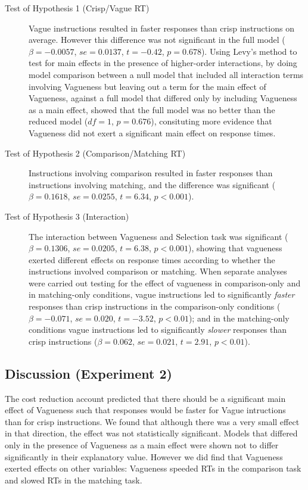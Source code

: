 \begin{description} 
	\item [Test of Hypothesis 1 (Crisp/Vague RT)] Vague instructions resulted in faster responses than crisp instructions on average. However this difference was not significant in the full model ($\beta=-0.0057$, $se=0.0137$, $t=-0.42$, $p=0.678$). Using Levy's method \citep{Levy:MainEffectsInteractions} to test for main effects in the presence of higher-order interactions, by doing model comparison between a null model that included all interaction terms involving Vagueness but leaving out a term for the main effect of Vagueness, against a full model that differed only by including Vagueness as a main effect, showed that the full model was no better than the reduced model ($df=1$, $p=0.676$), consituting more evidence that Vagueness did not exert a significant main effect on response times. 
	\item [Test of Hypothesis 2 (Comparison/Matching RT)] Instructions involving comparison resulted in faster responses than instructions involving matching, and the difference was significant ($\beta=0.1618$, $se=0.0255$, $t=6.34$, $p<0.001$).
	\item [Test of Hypothesis 3 (Interaction)] The interaction between Vagueness and Selection task was significant ($\beta=0.1306$, $se=0.0205$, $t=6.38$, $p<0.001$), showing that vagueness exerted different effects on response times according to whether the instructions involved comparison or matching. When separate analyses were carried out testing for the effect of vagueness in comparison-only and in matching-only conditions, vague instructions led to significantly \emph{faster} responses than crisp instructions in the comparison-only conditions ($\beta=-0.071$, $se=0.020$, $t=-3.52$, $p<0.01$); and in the matching-only conditions vague instructions led to significantly \emph{slower} responses than crisp instructions ($\beta=0.062$, $se=0.021$, $t=2.91$, $p<0.01$).
\end{description}

\subsection{Discussion (Experiment 2)}

The cost reduction account predicted that there should be a significant main effect of Vagueness such that responses would be faster for Vague intructions than for crisp instructions. We found that although there was a very small effect in that direction, the effect was not statistically significant. Models that differed only in the presence of Vagueness as a main effect were shown not to differ significantly in their explanatory value. However we did find that Vagueness exerted effects on other variables: Vagueness speeded RTs in the comparison task and slowed RTs in the matching task.
